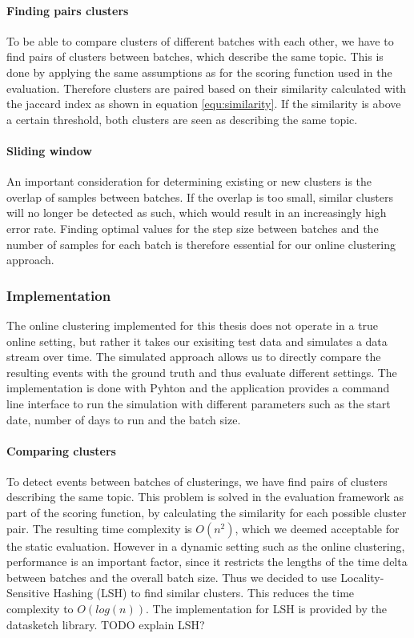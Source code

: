 \paragraph{Finding pairs clusters}

To be able to compare clusters of different batches with each other, we have to find pairs of clusters between batches, which describe the same topic. This is done by applying the same assumptions as for the scoring function used in the evaluation. Therefore clusters are paired based on their similarity calculated with the jaccard index as shown in equation \ref{equ:similarity}. If the similarity is above a certain threshold, both clusters are seen as describing the same topic.

\paragraph{Sliding window}

An important consideration for determining existing or new clusters is the overlap of samples between batches. If the overlap is too small, similar clusters will no longer be detected as such, which would result in an increasingly high error rate. Finding optimal values for the step size between batches and the number of samples for each batch is therefore essential for our online clustering approach.

\subsubsection{Implementation}

The online clustering implemented for this thesis does not operate in a true online setting, but rather it takes our exisiting test data and simulates a data stream over time. The simulated approach allows us to directly compare the resulting events with the ground truth and thus evaluate different settings. The implementation is done with Pyhton and the application provides a command line interface to run the simulation with different parameters such as the start date, number of days to run and the batch size.

\paragraph{Comparing clusters} To detect events between batches of clusterings, we have find pairs of clusters describing the same topic. This problem is solved in the evaluation framework as part of the scoring function, by calculating the similarity for each possible cluster pair. The resulting time complexity is $O(n^2)$, which we deemed acceptable for the static evaluation. However in a dynamic setting such as the online clustering, performance is an important factor, since it restricts the lengths of the time delta between batches and the overall batch size. Thus we decided to use Locality-Sensitive Hashing (LSH)\cite{alex2015practical} to find similar clusters. This reduces the time complexity to $O(log(n))$. The implementation for LSH is provided by the datasketch library\cite{eric_zhu_2017_290602}. TODO explain LSH?

